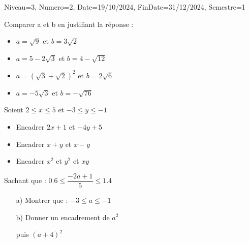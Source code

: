 \documentclass[a4paper,12pt]{article}
\begin{document}
\begin{Maquette}[DM]{Niveau=3, Numero=2, Date=19/10/2024, FinDate=31/12/2024, Semestre=1}

\begin{exercice}
\begin{enumerate}
\item Comparer a et b en justifiant la réponse :

\begin{minipage}{.5\linewidth}
\begin{itemize}
\item $ a=\sqrt{9}$ et $ b=3\sqrt{2}$
\item $a=5-2\sqrt{3} $ et $  b=4-\sqrt{12}$
\end{itemize}
\end{minipage}
\begin{minipage}{.5\linewidth}
\begin{itemize}
\item $ a=(\sqrt{3}+\sqrt{2})^{2}$ et $ b=2\sqrt{6}$
\item $ a=-5\sqrt{3}$ et $ b=-\sqrt{76}$
\end{itemize}
\end{minipage}
\begin{minipage}{.5\textwidth}
\item Soient $2\leq x\leq 5$ et $-3\leq y\leq -1$
\begin{itemize}
\item Encadrer $2x+1$ et $-4y+5$
\item Encadrer $x+y$ et $x-y$
\item Encadrer $x^{2}$ et $y^{2}$ et $xy$
\end{itemize}
\end{minipage}
\begin{minipage}{.5\textwidth}
\item Sachant que : $0.6\leq \dfrac{-2a+1}{5} \leq 1.4$
\begin{itemize}
\item[a)] Montrer que : $-3\leq a \leq -1$
\item[b)] Donner un encadrement de $a^{2}$

 puis $(a+4)^{2}$
\end{itemize}
\end{minipage}
\end{enumerate}
\end{exercice}


\end{Maquette}
\end{document}
